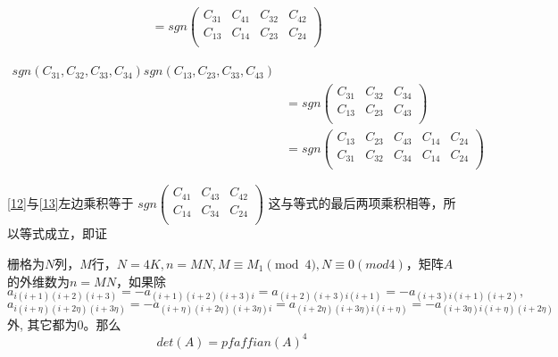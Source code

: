 \documentclass{amsc}          %
\numberwithin{equation}{section} %
\begin{document}
\begin{prof}
\begin{equation}\label{12}
\begin{aligned}
&=sgn\left(
\begin{array}{ccccc}
C_{31}&C_{41}&C_{32}&C_{42}\\
C_{13}&C_{14}&C_{23}&C_{24}\\
\end{array}\right)
\end{aligned}
\end{equation}

\begin{equation}\label{13}
\begin{aligned}
sgn(C_{31},C_{32},C_{33},C_{34})sgn(C_{13},C_{23},C_{33},C_{43})\\
&=sgn\left(
\begin{array}{ccccc}
C_{31}&C_{32}&C_{34}\\
C_{13}&C_{23}&C_{43}\\
\end{array}\right)\\
&=sgn\left(
\begin{array}{ccccc}
C_{13}&C_{23}&C_{43}&C_{14}&C_{24}\\
C_{31}&C_{32}&C_{34}&C_{14}&C_{24}\\
\end{array}\right)
\end{aligned}
\end{equation}

\ref{12}与\ref{13}左边乘积等于
$sgn\left(
\begin{array}{ccccc}
C_{41}&C_{43}&C_{42}\\
C_{14}&C_{34}&C_{24}\\
\end{array}\right)$
这与等式的最后两项乘积相等，所以等式成立，即证
\end{prof}

\begin{theorem}
栅格为$N$列，$M$行，$N = 4K,n=MN,M \equiv M_{1} \pmod{4},N \equiv 0 (mod 4)$，矩阵$A$的外维数为$n=MN$，如果除$$a_{i(i+1)(i+2)(i+3)}=-a_{(i+1)(i+2)(i+3)i}=a_{(i+2)(i+3)i(i+1)}=-a_{(i+3)i(i+1)(i+2)},$$$$a_{i(i+\eta)(i+2\eta)(i+3\eta)}=-a_{(i+\eta)(i+2\eta)(i+3\eta)i}=a_{(i+2\eta)(i+3\eta)i(i+\eta)}=-a_{(i+3\eta)i(i+\eta)(i+2\eta)}$$ 外, 其它都为0。那么$$det(A)=pfaffian(A)^{4}$$
\end{theorem}
\end{document}

